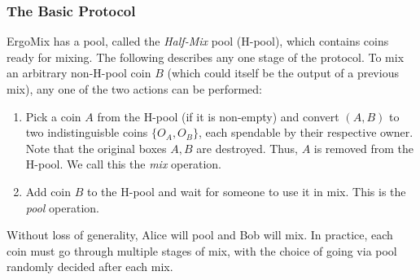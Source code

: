 \documentclass[11pt]{article}
\newcommand{\mixname}{ErgoMix\xspace}
\begin{document}
\subsubsection{The Basic Protocol}
\mixname has a pool, called the {\em Half-Mix} pool (H-pool), which contains coins ready for mixing. The following describes any one stage of the protocol. 
To mix an arbitrary non-H-pool coin $B$ (which could itself be the output of a previous mix), any one of the two actions can be performed:
\begin{enumerate}
	\item Pick a coin $A$ from the H-pool (if it is non-empty) and convert $(A, B)$ to two indistinguisble coins $\{O_A, O_B\}$, each spendable by their respective owner. Note that the original boxes $A, B$ are destroyed. Thus, $A$ is removed from the H-pool. We call this the {\em mix} operation. 
	\item Add coin $B$ to the H-pool and wait for someone to use it in mix. This is the {\em pool} operation.
\end{enumerate}


 Without loss of generality, Alice will pool and Bob will mix. In practice, each coin must go through multiple stages of mix, with the choice of going via pool randomly decided after each mix.
\end{document}
